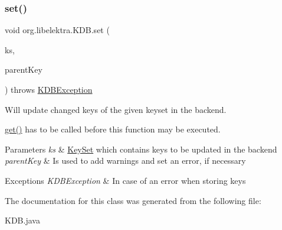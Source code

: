\subsubsection{\texorpdfstring{set()}{set()}}
{\footnotesize\ttfamily void org.\+libelektra.\+K\+D\+B.\+set (\begin{DoxyParamCaption}\item[{final \mbox{\hyperlink{classorg_1_1libelektra_1_1KeySet}{Key\+Set}}}]{ks,  }\item[{final \mbox{\hyperlink{classorg_1_1libelektra_1_1Key}{Key}}}]{parent\+Key }\end{DoxyParamCaption}) throws \mbox{\hyperlink{classorg_1_1libelektra_1_1exception_1_1KDBException}{K\+D\+B\+Exception}}\hspace{0.3cm}{\ttfamily [inline]}}



Will update changed keys of the given keyset in the backend. 

\mbox{\hyperlink{classorg_1_1libelektra_1_1KDB_a600abc786bde91a3122bd96be991a3d5}{get()}} has to be called before this function may be executed.


\begin{DoxyParams}{Parameters}
{\em ks} & \mbox{\hyperlink{classorg_1_1libelektra_1_1KeySet}{Key\+Set}} which contains keys to be updated in the backend \\
\hline
{\em parent\+Key} & Is used to add warnings and set an error, if necessary \\
\hline
\end{DoxyParams}

\begin{DoxyExceptions}{Exceptions}
{\em K\+D\+B\+Exception} & In case of an error when storing keys \\
\hline
\end{DoxyExceptions}


The documentation for this class was generated from the following file\+:\begin{DoxyCompactItemize}
\item 
K\+D\+B.\+java\end{DoxyCompactItemize}

